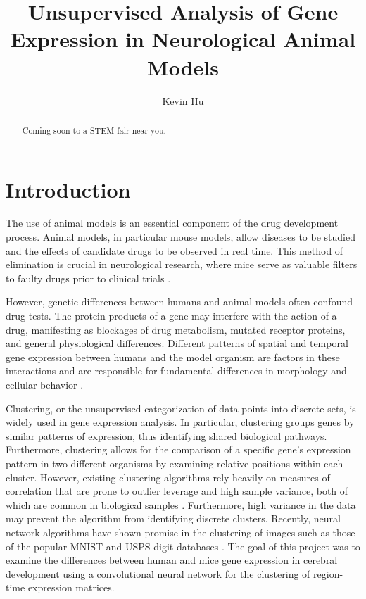 \documentclass[12pt,oneside,onecolumn,a4paper]{article}
\title{Unsupervised Analysis of Gene Expression in Neurological Animal Models\vspace{-0.4cm}}
\author{Kevin Hu\vspace{-0.4cm}}
\affil{Massachusetts Academy of Math and Science\vspace{-0.4cm}}
\date{}
\begin{document}
\maketitle

\begin{abstract}
   Coming soon to a STEM fair near you.
\end{abstract}

\break
\tableofcontents
\break

\section{Introduction}

The use of animal models is an essential component of the drug development process. Animal models, in particular mouse models, allow diseases to be studied and the effects of candidate drugs to be observed in real time. This method of elimination is crucial in neurological research, where mice serve as valuable filters to faulty drugs prior to clinical trials \citep{Lin_2014}.

However, genetic differences between humans and animal models often confound drug tests. The protein products of a gene may interfere with the action of a drug, manifesting as blockages of drug metabolism, mutated receptor proteins, and general physiological differences. Different patterns of spatial and temporal gene expression between humans and the model organism are factors in these interactions and are responsible for fundamental differences in morphology and cellular behavior \citep{Burns_2015}.

Clustering, or the unsupervised categorization of data points into discrete sets, is widely used in gene expression analysis. In particular, clustering groups genes by similar patterns of expression, thus identifying shared biological pathways. Furthermore, clustering allows for the comparison of a specific gene's expression pattern in two different organisms by examining relative positions within each cluster. However, existing clustering algorithms rely heavily on measures of correlation that are prone to outlier leverage and high sample variance, both of which are common in biological samples \citep{how_expression_works}. Furthermore, high variance in the data may prevent the algorithm from identifying discrete clusters. Recently, neural network algorithms have shown promise in the clustering of images such as those of the popular MNIST and USPS digit databases \citep{Krizhevsky2012ImageNetCW}. The goal of this project was to examine the differences between human and mice gene expression in cerebral development using a convolutional neural network for the clustering of region-time expression matrices. 
\end{document}
